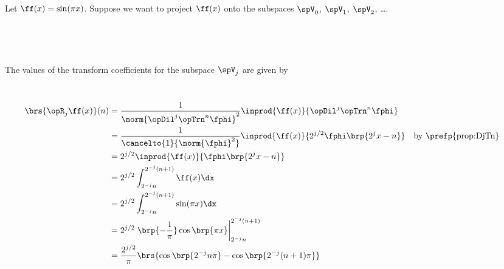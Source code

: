 \begin{example}
\begin{minipage}{\tw-68mm}
Let $\ff(x)=\sin(\pi x)$.
Suppose we want to project $\ff(x)$ onto the subspaces $\spV_0$, $\spV_1$, $\spV_2$, \ldots.
\end{minipage}%
\hfill%
\begin{minipage}{64mm}%
  \mbox{}\\%
\end{minipage}%
\\
\begin{minipage}{\tw-68mm}
\ragr
The values of the transform coefficients for the subspace $\spV_j$ are %
given by
\end{minipage}%
\hfill%
\begin{minipage}{64mm}
  
\end{minipage}
\\
  \begin{align*}
    \brs{\opR_j\ff(x)}(n) 
      &=    \frac{1}{\norm{\opDil^j\opTrn^n\fphi}^2}\inprod{\ff(x)}{\opDil^j\opTrn^n\fphi} 
    \\&=    \frac{1}{\cancelto{1}{\norm{\fphi}^2}}\inprod{\ff(x)}{2^{j/2}\fphi\brp{2^j x-n}} 
      &&    \text{by \prefp{prop:DjTn}}
    \\&=    2^{j/2} \inprod{\ff(x)}{\fphi\brp{2^j x-n}} 
    \\&=    2^{j/2} 
            \int_{2^{-j}n}^{2^{-j}(n+1)} \ff(x) \dx
    \\&=    2^{j/2} 
            \int_{2^{-j}n}^{2^{-j}(n+1)} \sin(\pi x) \dx
    \\&=    2^{j/2}
            \left. \brp{-\frac{1}{\pi}}\cos\brp{\pi x} \right|_{2^{-j} n}^{2^{-j}(n+1)}
    \\&=    \frac{2^{j/2}}{\pi}
            \brs{
              \cos\brp{{2^{-j}n\pi}} -
              \cos\brp{{2^{-j}(n+1)\pi}}  
              }
  \end{align*}




\end{example}
